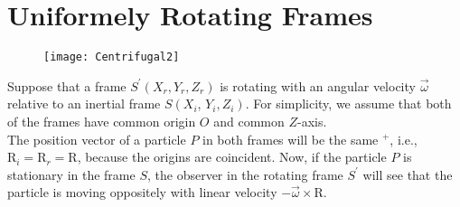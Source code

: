 \section{ Uniformely Rotating Frames }
\begin{figure}[H]
	\centering
	\texttt{[image: Centrifugal2]}
	\caption{}
	\label{}
\end{figure}
Suppose that a frame $S^{\prime}\left(X_{r}, Y_{r}, Z_{r}\right)$ is rotating with an angular velocity $\vec{\omega}$ relative to an inertial frame $S\left(X_{i}\right.$, $\left.Y_{i}, Z_{i}\right) .$ For simplicity, we assume that both of the frames have common origin $O$ and common $Z$-axis.\\
The position vector of a particle $P$ in both frames will be the same $^{+}$, i.e., $\mathrm{R}_{i}=\mathrm{R}_{r}=\mathrm{R}$, because the origins are coincident. Now, if the particle $P$ is stationary in the frame $S$, the observer in the rotating frame $S^{\prime}$ will see that the particle is moving oppositely with linear velocity $-\vec{\omega} \times \mathrm{R}$. 
